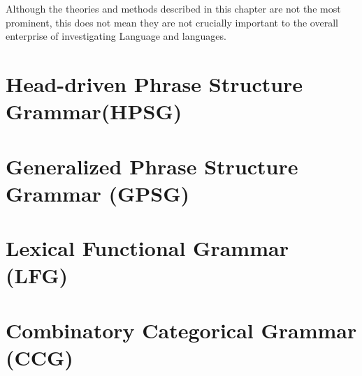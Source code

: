 

Although the theories and methods described in this chapter are not the most prominent, this does not mean they are not crucially important to the overall enterprise of investigating Language and languages.

\section{Head-driven Phrase Structure Grammar(HPSG)}
\section{Generalized Phrase Structure Grammar (GPSG)}
\section{Lexical Functional Grammar (LFG)} 
\section{Combinatory Categorical Grammar (CCG)} 

\section{}
\section{}
\section{}







